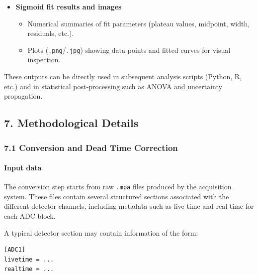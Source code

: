 \begin{itemize}
  \begin{itemize}
  \tightlist
  \item
    Profiles where points in the build‑up peak region have been removed,
    stored in a dedicated subfolder.
  \end{itemize}
\item
  \textbf{Sigmoid fit results and images}

  \begin{itemize}
  \tightlist
  \item
    Numerical summaries of fit parameters (plateau values, midpoint,
    width, residuals, etc.).\\
  \item
    Plots (\texttt{.png}/\texttt{.jpg}) showing data points and fitted
    curves for visual inspection.
  \end{itemize}
\end{itemize}

These outputs can be directly used in subsequent analysis scripts
(Python, R, etc.) and in statistical post‑processing such as ANOVA and
uncertainty propagation.

\hypertarget{methodological-details}{%
\subsection{7. Methodological Details}\label{methodological-details}}

\hypertarget{conversion-and-dead-time-correction}{%
\subsubsection{7.1 Conversion and Dead Time
Correction}\label{conversion-and-dead-time-correction}}

\hypertarget{input-data}{%
\paragraph{Input data}\label{input-data}}

The conversion step starts from raw \texttt{.mpa} files produced by the
acquisition system. These files contain several structured sections
associated with the different detector channels, including metadata such
as live time and real time for each ADC block.

A typical detector section may contain information of the form:

\begin{verbatim}
[ADC1]
livetime = ...
realtime = ...
\end{verbatim}


